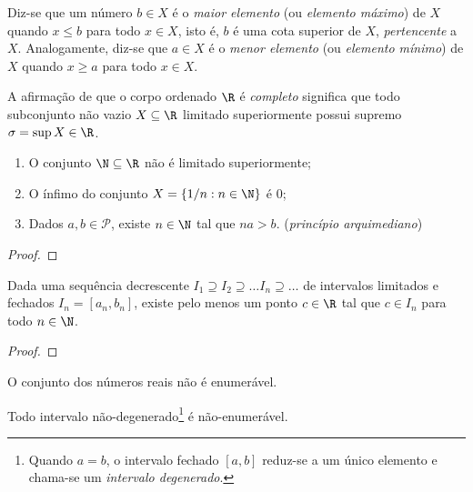 \documentclass{article}
\begin{document}
\begin{defn}
    Diz-se que um número \(b \in X\) é o \emph{maior elemento} (ou \emph{elemento máximo}) de \(X\) quando \(x \leq b\) para todo \(x \in X\), isto é, \(b\) é uma cota superior de \(X\), \emph{pertencente} a \(X\). Analogamente, diz-se que \(a \in X\) é o \emph{menor elemento} (ou \emph{elemento mínimo}) de \(X\) quando \(x \geq a\) para todo \(x \in X\).
\end{defn}

A afirmação de que o corpo ordenado \(\R\) é \emph{completo} significa que todo subconjunto não vazio \(X \subseteq \R\) limitado superiormente possui supremo \(\sigma = \sup X \in \R\).

\begin{thm} 
    \begin{enumerate}
        \item [(i)] O conjunto \(\N \subseteq \R\) não é limitado superiormente;
        \item [(ii)] O ínfimo do conjunto \(X = \{1/n : n \in \N\}\) é \(0\);
        \item [(iii)] Dados \(a, b \in \mathcal{P}\), existe \(n \in \N\) tal que \(na > b\). \hfill (\emph{princípio arquimediano})
    \end{enumerate}
\end{thm}

\begin{proof}
    
\end{proof}

\begin{thm} 
    Dada uma sequência decrescente \(I_1 \supseteq I_2 \supseteq \ldots I_n \supseteq \ldots\) de intervalos limitados e fechados \(I_n = [a_n, b_n]\), existe pelo menos um ponto \(c \in \R\) tal que \(c \in I_n\) para todo \(n \in \N\).
\end{thm}

\begin{proof}
    
\end{proof}

\begin{thm}
    O conjunto dos números reais não é enumerável.
\end{thm}

\begin{cor}
    Todo intervalo não-degenerado\footnote{Quando \(a=b\), o intervalo fechado \([a,b]\) reduz-se a um único elemento e chama-se um \emph{intervalo degenerado}.} é não-enumerável.
\end{cor}
\end{document}
